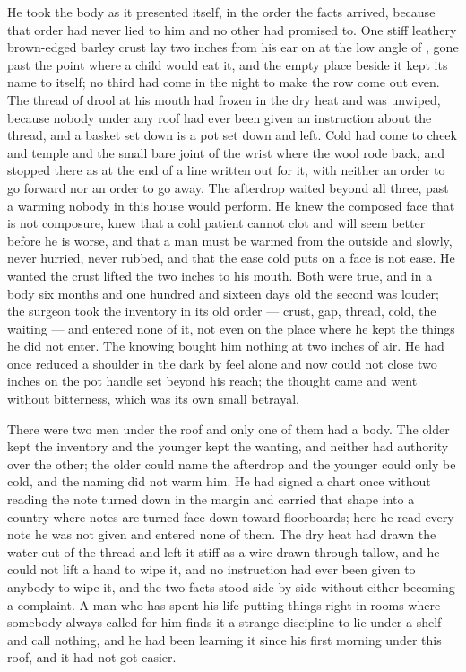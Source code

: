 He took the body as it presented itself, in the order the facts arrived, because that order had never lied to him and no other had promised to. One stiff leathery brown-edged barley crust lay two inches from his ear on  at the low angle of , gone past the point where a child would eat it, and the empty place beside it kept its name to itself; no third had come in the night to make the row come out even. The thread of drool at his mouth had frozen in the dry heat and was unwiped, because nobody under any roof had ever been given an instruction about the thread, and a basket set down is a pot set down and left. Cold had come to cheek and temple and the small bare joint of the wrist where the wool rode back, and stopped there as at the end of a line written out for it, with neither an order to go forward nor an order to go away. The afterdrop waited beyond all three, past a warming nobody in this house would perform. He knew the composed face that is not composure, knew that a cold patient cannot clot and will seem better before he is worse, and that a man must be warmed from the outside and slowly, never hurried, never rubbed, and that the ease cold puts on a face is not ease. He wanted the crust lifted the two inches to his mouth. Both were true, and in a body six months and one hundred and sixteen days old the second was louder; the surgeon took the inventory in its old order --- crust, gap, thread, cold, the waiting --- and entered none of it, not even on the place where he kept the things he did not enter. The knowing bought him nothing at two inches of air. He had once reduced a shoulder in the dark by feel alone and now could not close two inches on the pot handle set beyond his reach; the thought came and went without bitterness, which was its own small betrayal.

There were two men under the roof and only one of them had a body. The older kept the inventory and the younger kept the wanting, and neither had authority over the other; the older could name the afterdrop and the younger could only be cold, and the naming did not warm him. He had signed a chart once without reading the note turned down in the margin and carried that shape into a country where notes are turned face-down toward floorboards; here he read every note he was not given and entered none of them. The dry heat had drawn the water out of the thread and left it stiff as a wire drawn through tallow, and he could not lift a hand to wipe it, and no instruction had ever been given to anybody to wipe it, and the two facts stood side by side without either becoming a complaint. A man who has spent his life putting things right in rooms where somebody always called for him finds it a strange discipline to lie under a shelf and call nothing, and he had been learning it since his first morning under this roof, and it had not got easier.

